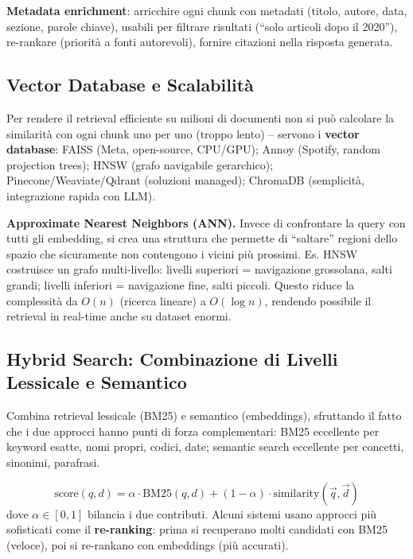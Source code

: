 \documentclass[12pt,a4paper]{article}
\begin{document}
\textbf{Metadata enrichment}: arricchire ogni chunk con metadati (titolo, autore, data, sezione, parole chiave), usabili per filtrare risultati (``solo articoli dopo il 2020''), re-rankare (priorit\`a a fonti autorevoli), fornire citazioni nella risposta generata.

\subsection{Vector Database e Scalabilit\`a}

Per rendere il retrieval efficiente su milioni di documenti non si pu\`o calcolare la similarit\`a con ogni chunk uno per uno (troppo lento) -- servono i \textbf{vector database}: FAISS (Meta, open-source, CPU/GPU); Annoy (Spotify, random projection trees); HNSW (grafo navigabile gerarchico); Pinecone/Weaviate/Qdrant (soluzioni managed); ChromaDB (semplicit\`a, integrazione rapida con LLM).

\begin{defbox}
\textbf{Approximate Nearest Neighbors (ANN).}
Invece di confrontare la query con tutti gli embedding, si crea una struttura che permette di ``saltare'' regioni dello spazio che sicuramente non contengono i vicini pi\`u prossimi. Es. HNSW costruisce un grafo multi-livello: livelli superiori = navigazione grossolana, salti grandi; livelli inferiori = navigazione fine, salti piccoli. Questo riduce la complessit\`a da $O(n)$ (ricerca lineare) a $O(\log n)$, rendendo possibile il retrieval in real-time anche su dataset enormi.
\end{defbox}

\subsection{Hybrid Search: Combinazione di Livelli Lessicale e Semantico}

Combina retrieval lessicale (BM25) e semantico (embeddings), sfruttando il fatto che i due approcci hanno punti di forza complementari: BM25 eccellente per keyword esatte, nomi propri, codici, date; semantic search eccellente per concetti, sinonimi, parafrasi.

\begin{formulabox}
\[
\text{score}(q,d) = \alpha \cdot \text{BM25}(q,d) + (1-\alpha)\cdot\text{similarity}(\vec{q},\vec{d})
\]
dove $\alpha\in[0,1]$ bilancia i due contributi. Alcuni sistemi usano approcci pi\`u sofisticati come il \textbf{re-ranking}: prima si recuperano molti candidati con BM25 (veloce), poi si re-rankano con embeddings (pi\`u accurati).
\end{formulabox}
\end{document}
